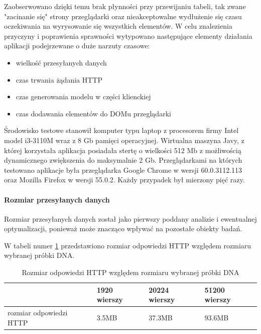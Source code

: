 \documentclass[a4paper,12pt,twoside]{article}
\begin{document}
Zaobserwowano dzięki temu brak płynności przy przewijaniu tabeli, tak zwane "zacinanie się" strony przeglądarki oraz nieakceptowalne wydłużenie się 
czasu oczekiwania na wyrysowanie się wszystkich elementów. 
W celu znalezienia przyczyny i poprawienia sprawności 
wytypowano następujące elementy działania aplikacji podejrzewane o duże narzuty czasowe:

\begin{itemize}
\item wielkość przesyłanych danych
\item czas trwania żądania HTTP
\item czas generowania modelu w części klienckiej
\item czas dodawania elementów do DOMu przeglądarki
\end{itemize} 

Środowisko testowe stanowił komputer typu laptop z 
procesorem firmy Intel model i3-3110M wraz z 8 Gb pamięci operacyjnej.
Wirtualna maszyna Javy, z której korzystała aplikacja posiadała stertę
o wielkości 512 Mb z możliwością dynamicznego zwiększenia do maksymalnie 2 Gb.
Przeglądarkami na których testowano aplikacje była przeglądarka 
Google Chrome w wersji 60.0.3112.113 oraz Mozilla Firefox w wersji 55.0.2.
Każdy przypadek był mierzony pięć razy.  

\newpage
\paragraph{Rozmiar przesyłanych danych}
Rozmiar przesyłanych danych został jako pierwszy poddany analizie i
ewentualnej optymalizacji, ponieważ może znacząco wpływać na pozostałe 
obiekty badań.

W tabeli numer \ref{table:requestSizeNoOpt} przedstawiono rozmiar 
odpowiedzi HTTP względem rozmiaru wybranej próbki DNA.

\begin{center}
\begin{table} [H]
\begin{tabular}{| p{4cm} | p{2.7cm} | p{2.7cm} | p{2.7cm}|}
\hline
& 1920 wierszy &  20224 wierszy & 51200 wierszy\\ 
\hline
rozmiar odpowiedzi HTTP& 3.5MB&37.3MB& 93.6MB\\ \hline  
\end{tabular}

\caption{Rozmiar odpowiedzi HTTP względem rozmiaru wybranej próbki DNA}
\label{table:requestSizeNoOpt}
\end{table}
\end{center} 
\end{document}
